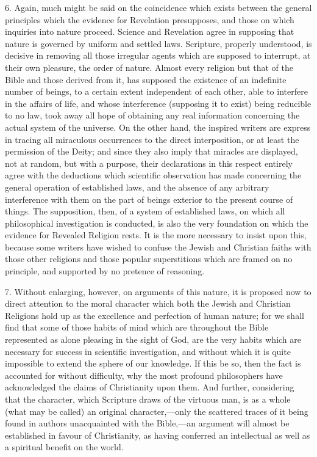 6. Again, much might be said on the coincidence which exists
between the general principles which the evidence for Revelation
presupposes, and those on which inquiries into nature proceed. Science
and Revelation agree in supposing that nature is governed by uniform
and settled laws. Scripture, properly understood, is decisive in
removing all those irregular agents which are supposed to interrupt,
at their own pleasure, the order of nature. Almost every religion but
that of the Bible and those derived from it, has supposed the
existence of an indefinite number of beings, to a certain extent
independent of each other, able to interfere in the affairs of life,
and whose interference (supposing it to exist) being reducible to no
law, took away all hope of obtaining any real information concerning
the actual system of the universe. On the other hand, the inspired
writers are express in tracing all miraculous occurrences to the
direct interposition, or at least the permission of the Deity; and
since they also imply that miracles are displayed, not at random, but
with a purpose, their declarations in this respect entirely agree with
the deductions which scientific observation has made concerning the
general operation of established laws, and the absence of any
arbitrary interference with them on the part of beings exterior to the
present course of things. The supposition, then, of a system of
established laws, on which all philosophical investigation is
conducted, is also the very foundation on which the evidence for
Revealed Religion rests. It is the more necessary to insist upon this,
because some writers have wished to confuse the Jewish and Christian
faiths with those other religions and those popular superstitions
which are framed on no principle, and supported by no pretence of
reasoning.

7. Without enlarging, however, on arguments of this nature, it is
proposed now to direct attention to the moral character which both the
Jewish and Christian Religions hold up as the excellence and
perfection of human nature; for we shall find that some of those
habits of mind which are throughout the Bible represented as alone
pleasing in the sight of God, are the very habits which are necessary
for success in scientific investigation, and without which it is quite
impossible to extend the sphere of our knowledge. If this be so, then
the fact is accounted for without difficulty, why the most profound
philosophers have acknowledged the claims of Christianity upon them.
And further, considering that the character, which Scripture draws of
the virtuous man, is as a whole (what may be called) an original
character,—only the scattered traces of it being found in authors
unacquainted with the Bible,—an argument will almost be established
in favour of Christianity, as having conferred an intellectual as well
as a spiritual benefit on the world.

